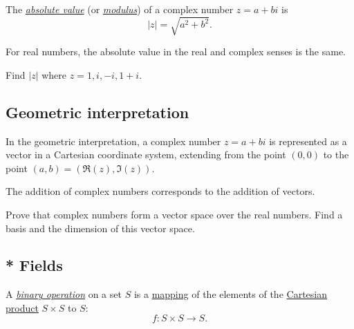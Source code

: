 
\begin{definition}
The \underline{\it absolute value} (or \underline{\it modulus}) of a complex number $z=a+b i$ is
$$
|z| = \sqrt{a^2+b^2} .
$$
\end{definition}

\begin{remark} For real numbers, the absolute value in the real and complex senses is the same.
\end{remark}

\begin{exercise}
    Find $|z|$ where $z = 1, i, -i, 1+i$.
    \end{exercise}

\subsection{Geometric interpretation}

In the geometric interpretation, a complex number $ z = a+bi$ is represented as a vector in a Cartesian coordinate system, extending from the point $(0, 0)$ to the point $(a, b) = (\Re(z), \Im(z))$.

The addition of complex numbers corresponds to the addition of vectors.

\begin{exercise}
Prove that complex numbers form a vector space over the real numbers. Find a basis and the dimension of this vector space.
\end{exercise}

\subsection{* Fields}

\begin{definition}
A \underline{\it binary operation} on a set $S$ is a \underline{mapping} of the elements of the \underline{Cartesian product} $S \times S$ to $S$:
$$
f \colon S \times S \rightarrow S.
$$
\end{definition}

